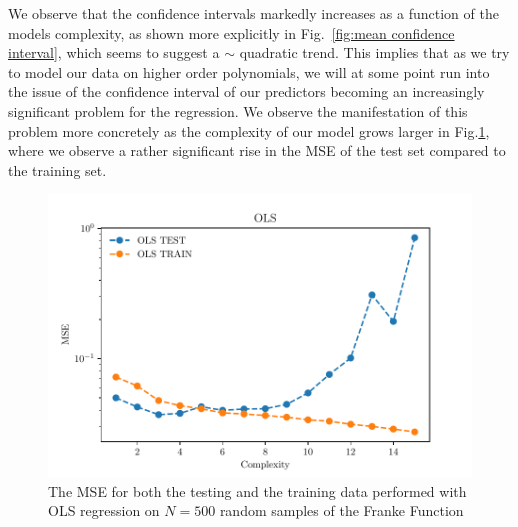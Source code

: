 \documentclass[reprint, english, nofootinbib]{revtex4-2}
\begin{document}
We observe that the confidence intervals markedly increases as a function of the models complexity, as shown more explicitly in Fig.~\ref{fig:mean confidence interval}, which seems to suggest a $\sim$ quadratic trend. This implies that as we try to model our data on higher order polynomials, we will at some point run into the issue of the confidence interval of our predictors becoming an increasingly significant problem for the regression.
We observe the manifestation of this problem more concretely as the complexity of our model grows larger in Fig.\ref{fig:Hastie2.11 MSE Bootstrap}, where we observe a rather significant rise in the MSE of the test set compared to the training set.

\begin{figure}[h!tb]
    \center
    \includegraphics[width=\columnwidth]{OLS_MSE_Hastie_211_N_500.pdf}
    \caption{\label{fig:Hastie2.11 MSE Bootstrap}The MSE for both the testing and the training data performed with OLS regression on $N=500$ random samples of the Franke Function}
\end{figure}
\end{document}
